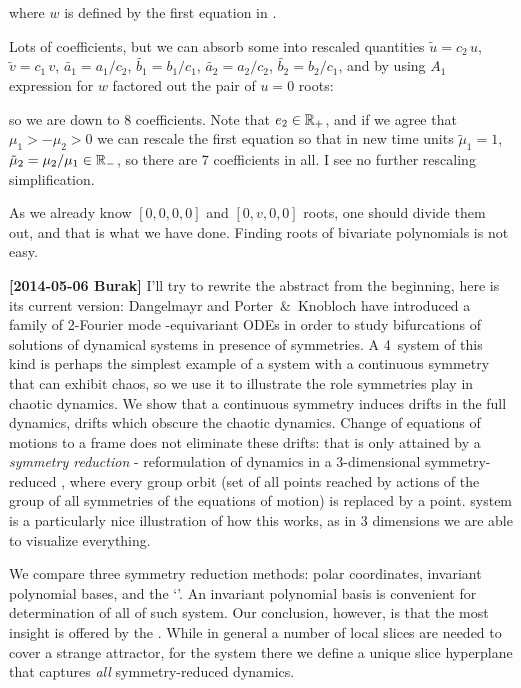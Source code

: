 
where $w$ is defined by the first equation in
.

Lots of coefficients, but we can
absorb some into rescaled quantities
$\tilde{u} = c_2\,u$,
$\tilde{v} = c_1\,v$,
$\tilde{a_1} = a_1/c_2$,
$\tilde{b_1} = b_1/c_1$,
$\tilde{a_2} = a_2/c_2$,
$\tilde{b_2} = b_2/c_1$,
and by using $A_1$ expression for $w$ factored out the pair of $u=0$
roots:

so we are down to 8 coefficients. Note that $e_2 \in \mathbb{R}_{+}$, and if
we agree that  $\mu_1 > -\mu_2 > 0$ we can rescale the first equation so
that in new time units $\tilde{\mu}_1 =1$, $\tilde{\mu}_2 = \mu_2/\mu_1
\in \mathbb{R}_{-}$, so there are 7 coefficients in all. I see no further
rescaling simplification.

As we already know $[0,0,0,0]$ and $[0,v,0,0]$ roots, one should divide
them out, and that is what we have done. Finding
roots of bivariate polynomials is not easy.

{\bf[2014-05-06 Burak]} I'll try to rewrite the abstract from the beginning,
here is its current version:
\newline
Dangelmayr and Porter~\&\ Knobloch have
introduced a family of 2-Fourier mode -equivariant ODEs  in order to
study bifurcations of solutions of dynamical systems in presence of
symmetries. A 4\dmn\ system of this kind is perhaps the simplest
example of a system with a continuous symmetry that can exhibit chaos, so
we use it to illustrate the role symmetries play in chaotic dynamics. We
show that a continuous symmetry induces drifts in the full
{\statesp} dynamics, drifts which obscure the chaotic dynamics. Change of
equations of motions to a {\comovframe} frame
does not eliminate these drifts: that is only attained by a
\emph{symmetry reduction} - reformulation of dynamics in a 3-dimensional
symmetry-reduced {\statesp}, where every group orbit (set of all points
reached by actions of the group of all symmetries of the equations of
motion) is replaced by a point. {\twoMode} system is a
particularly nice illustration of how this works, as in 3 dimensions we
are able to visualize everything.

We compare three symmetry reduction methods: polar coordinates, invariant
polynomial bases, and the `{\mslices}'. An invariant polynomial
basis is convenient for determination of all {\reqva} of such
system. Our conclusion, however, is that the most insight is offered by
the {\mslices}. While in general a number of local slices are
needed to cover a strange attractor, for the {\twomode}
system there we define a unique slice hyperplane that captures
\emph{all} symmetry-reduced dynamics. 

